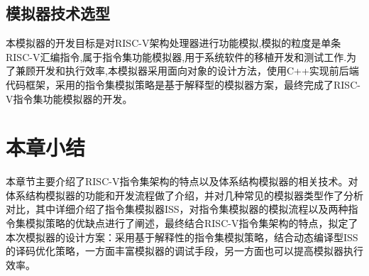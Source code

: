 \subsection{模拟器技术选型}
本模拟器的开发目标是对RISC-V架构处理器进行功能模拟,模拟的粒度是单条RISC-V汇编指令,属于指令集功能模拟器,用于系统软件的移植开发和测试工作.为了兼顾开发和执行效率,本模拟器采用面向对象的设计方法，使用C++实现前后端代码框架，采用的指令集模拟策略是基于解释型的模拟器方案，最终完成了RISC-V指令集功能模拟器的开发。


\section{本章小结}
本章节主要介绍了RISC-V指令集架构的特点以及体系结构模拟器的相关技术。对体系结构模拟器的功能和开发流程做了介绍，并对几种常见的模拟器类型作了分析对比，其中详细介绍了指令集模拟器ISS，对指令集模拟器的模拟流程以及两种指令集模拟策略的优缺点进行了阐述，最终结合RISC-V指令集架构的特点，拟定了本次模拟器的设计方案：采用基于解释性的指令集模拟策略，结合动态编译型ISS的译码优化策略，一方面丰富模拟器的调试手段，另一方面也可以提高模拟器执行效率。
